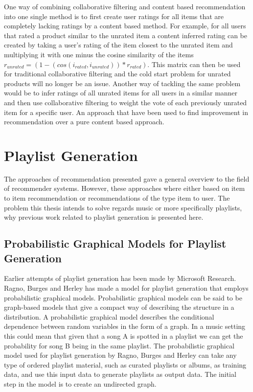 \documentclass[a4paper,11pt]{kth-mag}
\begin{document}
One way of combining collaborative filtering and content based recommendation into one single method is to first create user ratings for all items that are completely lacking ratings by a content based method. For example, for all users that rated a product similar to the unrated item a content inferred rating can be created by taking a user's rating of the item closest to the unrated item and multiplying it with one minus the cosine similarity of the items $r_{unrated}  = (1 - (cos(i_{rated},i_{unrated})) * r_{rated})$. This matrix can then be used for traditional collaborative filtering and the cold start problem for unrated products will no longer be an issue. Another way of tackling the same problem would be to infer ratings of all unrated items for all users in a similar manner and then use collaborative filtering to weight the vote of each previously unrated item for a specific user. An approach that have been used to find improvement in recommendation over a pure content based approach\cite{melville2002content}.
\section{Playlist Generation}
The approaches of recommendation presented gave a general overview to the field of recommender systems. However, these approaches where either based on item to item recommendation or recommendations of the type item to user. The problem this thesis intends to solve regards music or more specifically playlists, why previous work related to playlist generation is presented here. 

\subsection{Probabilistic Graphical Models for Playlist Generation}
Earlier attempts of playlist generation has been made by Microsoft Research\cite{ragno2005inferring}. Ragno, Burges and Herley has made a model for playlist generation that employs probabilistic graphical models. Probabilistic graphical models can be said to be graph-based models that give a compact way of describing the structure in a distribution. A probabilistic graphical model describes the conditional dependence between random variables in the form of a graph\cite{koller2009probabilistic}. In a music setting this could mean that given that a song A is spotted in a playlist we can get the probability for song B being in the same playlist. The probabilistic graphical model used for playlist generation by Ragno, Burges and Herley can take any type of ordered playlist material, such as curated playlists or albums, as training data, and use this input data to generate playlists as output data. The initial step in the model is to create an undirected graph. 
\end{document}
